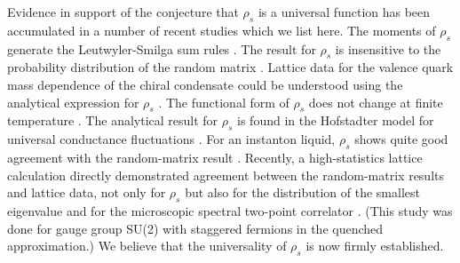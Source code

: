 Evidence in support of the conjecture that $\rho_s$ is a universal
function has been accumulated in a number of recent studies which we
list here. The moments of $\rho_s$ generate the Leutwyler-Smilga sum
rules \cite{Verb93}.  The result for $\rho_s$ is insensitive to the
probability distribution of the random matrix \cite{Brez96,Nish96}.
Lattice data for the valence quark mass dependence of the chiral
condensate could be understood using the analytical expression for
$\rho_s$ \cite{Chan95,Verb96a}.  The functional form of $\rho_s$ does
not change at finite temperature \cite{Jack96b}.  The analytical
result for $\rho_s$ is found in the Hofstadter model for universal
conductance fluctuations \cite{Slev93}.  For an instanton liquid,
$\rho_s$ shows quite good agreement with the random-matrix result
\cite{Verb94b}.  Recently, a high-statistics lattice calculation
directly demonstrated agreement between the random-matrix results and
lattice data, not only for $\rho_s$ but also for the distribution of
the smallest eigenvalue and for the microscopic spectral two-point
correlator \cite{Berb97a}. (This study was done for gauge group SU(2)
with staggered fermions in the quenched approximation.)  We believe
that the universality of $\rho_s$ is now firmly established.

